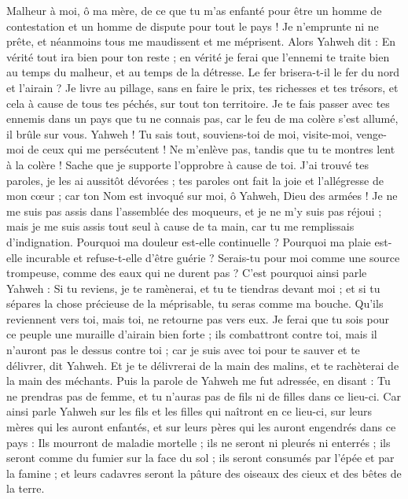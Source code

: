 \begin{multicols}{2}
Malheur à moi, ô ma mère, de ce que tu m'as enfanté pour être un homme de contestation et un homme de dispute pour tout le pays ! Je n'emprunte ni ne prête, et néanmoins tous me maudissent et me méprisent.
Alors Yahweh dit : En vérité tout ira bien pour ton reste ; en vérité je ferai que l’ennemi te traite bien au temps du malheur, et au temps de la détresse.
Le fer brisera-t-il le fer du nord et l'airain ?
Je livre au pillage, sans en faire le prix, tes richesses et tes trésors, et cela à cause de tous tes péchés, sur tout ton territoire.
Je te fais passer avec tes ennemis dans un pays que tu ne connais pas, car le feu de ma colère s'est allumé, il brûle sur vous.
Yahweh ! Tu sais tout, souviens-toi de moi, visite-moi, venge-moi de ceux qui me persécutent ! Ne m'enlève pas, tandis que tu te montres lent à la colère ! Sache que je supporte l'opprobre à cause de toi.
J'ai trouvé tes paroles, je les ai aussitôt dévorées ; tes paroles ont fait la joie et l'allégresse de mon cœur ; car ton Nom est invoqué sur moi, ô Yahweh, Dieu des armées !
Je ne me suis pas assis dans l'assemblée des moqueurs, et je ne m'y suis pas réjoui ; mais je me suis assis tout seul à cause de ta main, car tu me remplissais d'indignation.
Pourquoi ma douleur est-elle continuelle ? Pourquoi ma plaie est-elle incurable et refuse-t-elle d'être guérie ? Serais-tu pour moi comme une source trompeuse, comme des eaux qui ne durent pas ?
C'est pourquoi ainsi parle Yahweh : Si tu reviens, je te ramènerai, et tu te tiendras devant moi ; et si tu sépares la chose précieuse de la méprisable, tu seras comme ma bouche. Qu'ils reviennent vers toi, mais toi, ne retourne pas vers eux.
Je ferai que tu sois pour ce peuple une muraille d'airain bien forte ; ils combattront contre toi, mais il n'auront pas le dessus contre toi ; car je suis avec toi pour te sauver et te délivrer, dit Yahweh.
Et je te délivrerai de la main des malins, et te rachèterai de la main des méchants.
\VerseOne{}Puis la parole de Yahweh me fut adressée, en disant :
Tu ne prendras pas de femme, et tu n'auras pas de fils ni de filles dans ce lieu-ci.
Car ainsi parle Yahweh sur les fils et les filles qui naîtront en ce lieu-ci, sur leurs mères qui les auront enfantés, et sur leurs pères qui les auront engendrés dans ce pays :
Ils mourront de maladie mortelle ; ils ne seront ni pleurés ni enterrés ; ils seront comme du fumier sur la face du sol ; ils seront consumés par l'épée et par la famine ; et leurs cadavres seront la pâture des oiseaux des cieux et des bêtes de la terre.

\end{multicols}
